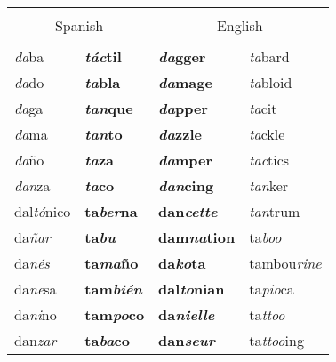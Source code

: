 \begin{table}[ht]
\centering
{\scriptsize{
\begin{tabular}{@{}llll@{}}

\hline \\ [-1.5ex]
\multicolumn{2}{c}{Spanish}       & \multicolumn{2}{c}{English} \\ [1ex]
\hline \\ [-1.5ex]
\emph{da}ba        & \textbf{\emph{t\'ac}til}  & \textbf{\emph{da}gger}    & \emph{ta}bard \\
\emph{da}do        & \textbf{\emph{ta}bla}     & \textbf{\emph{da}mage}    & \emph{ta}bloid \\
\emph{da}ga        & \textbf{\emph{tan}que}    & \textbf{\emph{da}pper}    & \emph{ta}cit \\
\emph{da}ma        & \textbf{\emph{tan}to}     & \textbf{\emph{da}zzle}    & \emph{ta}ckle \\
\emph{da}\~no      & \textbf{\emph{ta}za}      & \textbf{\emph{da}mper}    & \emph{tac}tics \\
\emph{dan}za       & \textbf{\emph{ta}co}      & \textbf{\emph{dan}cing}   & \emph{tan}ker \\
dal\emph{t\'o}nico & \textbf{ta\emph{ber}na}   & \textbf{dan\emph{cette}}  & \emph{tan}trum \\
da\emph{\~nar}     & \textbf{ta\emph{bu}}      & \textbf{dam\emph{na}tion} & ta\emph{boo} \\
da\emph{n\'es}     & \textbf{ta\emph{ma}\~no}  & \textbf{da\emph{ko}ta}    & tambou\emph{rine} \\
da\emph{ne}sa      & \textbf{tam\emph{bi\'en}} & \textbf{dal\emph{to}nian} & ta\emph{pio}ca \\
da\emph{ni}no      & \textbf{tam\emph{po}co}   & \textbf{da\emph{nielle}}  & ta\emph{ttoo} \\
dan\emph{zar}      & \textbf{ta\emph{ba}co}    & \textbf{dan\emph{seur}}   & ta\emph{ttoo}ing \\ [1ex]
\hline
\end{tabular}
}}
\end{table}